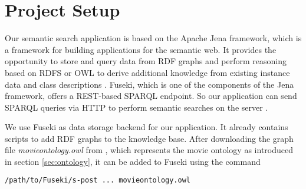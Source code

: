 \section{Project Setup}
Our semantic search application is based on the Apache Jena framework, which is a framework for building applications for the semantic web. %
It provides the opportunity to store \cite{jena:tdb} and query \cite{jena:arq} data from RDF graphs and perform reasoning based on RDFS or OWL to derive additional knowledge from existing instance data and class descriptions \cite{jena:inference, jena:ontology}. Fuseki, which is one of the components of the Jena framework, offers a REST-based SPARQL endpoint. So our application can send SPARQL queries via HTTP to perform semantic searches on the server \cite{jena:fuseki}.







We use Fuseki as data storage backend for our application. It already contains scripts to add RDF graphs to the knowledge base. After downloading the graph file \textit{movieontology.owl} from \cite{bouza:movieontology}, which represents the movie ontology as introduced in section \ref{sec:ontology}, it can be added to Fuseki using the command
\begin{lstlisting}[language=bash]
/path/to/Fuseki/s-post ... movieontology.owl
\end{lstlisting}

